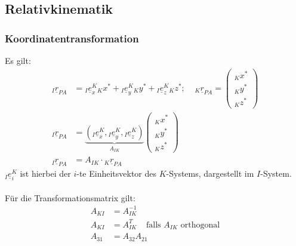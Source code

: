 \documentclass[a4paper,twocolumn,10pt]{article}
\begin{document}
\subsection{Relativkinematik}

\subsubsection{Koordinatentransformation}
Es gilt:
\begin{equation*}
\begin{split}
{}_I\underline{r}_{PA}&= {}_I\underline{e}_x^K {}_Kx^*+ {}_I\underline{e}_y^K {}_Ky^*+ {}_I\underline{e}_z^K {}_Kz^*;\;\;\;\;{_K}\underline{r}_{PA}=\begin{pmatrix}{}_Kx^* \\ {}_Ky^* \\ {}_Kz^*\end{pmatrix}\\
{}_I\underline{r}_{PA}&=\underbrace{\left({}_I\underline{e}_x^K,{}_I\underline{e}_y^K,{}_I\underline{e}_z^K\right)}_{A_{IK}}\begin{pmatrix}{}_Kx^* \\ {}_Ky^* \\ {}_Kz^*\end{pmatrix}\\
{}_I\underline{r}_{PA}&=A_{IK}\cdot{}_K\underline{r}_{PA}
\end{split}
\end{equation*}
${}_I\underline{e}_i^K$ ist hierbei der $i$-te Einheitsvektor des $K$-Systems, dargestellt im $I$-System.\\\\
Für die Transformationsmatrix gilt:
\begin{equation*}
\begin{split}
A_{KI}&=A_{IK}^{-1}\\
A_{KI}&=A_{IK}^T\;\;\;\;\text{falls }A_{IK}\text{ orthogonal}\\
A_{31}&=A_{32}A_{21}
\end{split}
\end{equation*}
\end{document}
